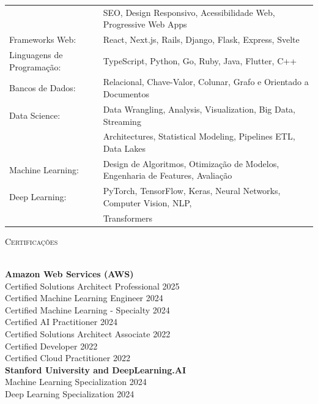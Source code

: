\documentclass[a4paper]{article}
\newcommand{\lineunder} {
    \vspace*{-8pt} \\
    \hspace*{-18pt} \hrulefill \\
}
\newcommand{\header} [1] {
    {\hspace*{-18pt}\vspace*{6pt} \textsc{#1}}
    \vspace*{-6pt} \lineunder
}
\begin{document}
\begin{tabular}{ @{}l l }
	                                     & SEO, Design Responsivo, Acessibilidade Web, Progressive Web Apps  \\[0.5ex]
	Frameworks Web:                     
& React, Next.js, Rails, Django, Flask, Express, Svelte           \\[0.5ex]
	Linguagens de Programação:           & TypeScript, Python, Go, Ruby, Java, Flutter, C++               \\[0.5ex]
	Bancos de Dados:                     & Relacional, Chave-Valor, Colunar, Grafo e Orientado a Documentos   \\[0.5ex]
	Data 
Science:                        & Data Wrangling, Analysis, Visualization, Big Data, Streaming      \\
	                                     & Architectures, Statistical Modeling, Pipelines ETL, Data Lakes        \\[0.5ex]
	Machine Learning:                   
  & Design de Algoritmos, Otimização de Modelos, Engenharia de Features, Avaliação \\[0.5ex]
	Deep Learning:                       & PyTorch, TensorFlow, Keras, Neural Networks, Computer Vision, NLP,       \\
	                                     & 
Transformers                                                     \\
\end{tabular}
\vspace{6mm}

\header{Certificações}
\vspace{1mm}

\textbf{Amazon Web Services (AWS)}          \hfill       \\
Certified Solutions Architect Professional  \hfill 2025  \\
Certified Machine Learning Engineer         \hfill 2024  \\
Certified Machine 
Learning - Specialty      \hfill 2024  \\
Certified AI Practitioner                   \hfill 2024  \\
Certified Solutions Architect Associate     \hfill 2022  \\
Certified Developer                         \hfill 2022  \\
Certified Cloud Practitioner                \hfill 2022  \\

\vspace{1mm}
\textbf{Stanford University and DeepLearning.AI} 
\hfill      \\
Machine Learning Specialization                  \hfill 2024 \\
Deep Learning Specialization                     \hfill 2024 \\
\end{document}
